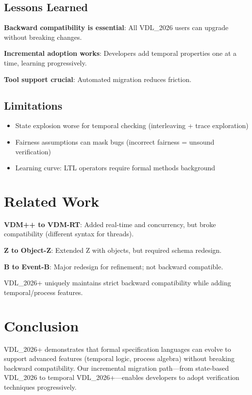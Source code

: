 \documentclass[conference]{IEEEtran}
\begin{document}
\subsection{Lessons Learned}

\textbf{Backward compatibility is essential}: All VDL\_2026 users can upgrade without breaking changes.

\textbf{Incremental adoption works}: Developers add temporal properties one at a time, learning progressively.

\textbf{Tool support crucial}: Automated migration reduces friction.

\subsection{Limitations}

\begin{itemize}
\item State explosion worse for temporal checking (interleaving + trace exploration)
\item Fairness assumptions can mask bugs (incorrect fairness = unsound verification)
\item Learning curve: LTL operators require formal methods background
\end{itemize}

\section{Related Work}
\label{sec:related}

\textbf{VDM++ to VDM-RT}: Added real-time and concurrency, but broke compatibility (different syntax for threads).

\textbf{Z to Object-Z}: Extended Z with objects, but required schema redesign.

\textbf{B to Event-B}: Major redesign for refinement; not backward compatible.

VDL\_2026+ uniquely maintains strict backward compatibility while adding temporal/process features.

\section{Conclusion}
\label{sec:conclusion}

VDL\_2026+ demonstrates that formal specification languages can evolve to support advanced features (temporal logic, process algebra) without breaking backward compatibility. Our incremental migration path---from state-based VDL\_2026 to temporal VDL\_2026+---enables developers to adopt verification techniques progressively.
\end{document}
